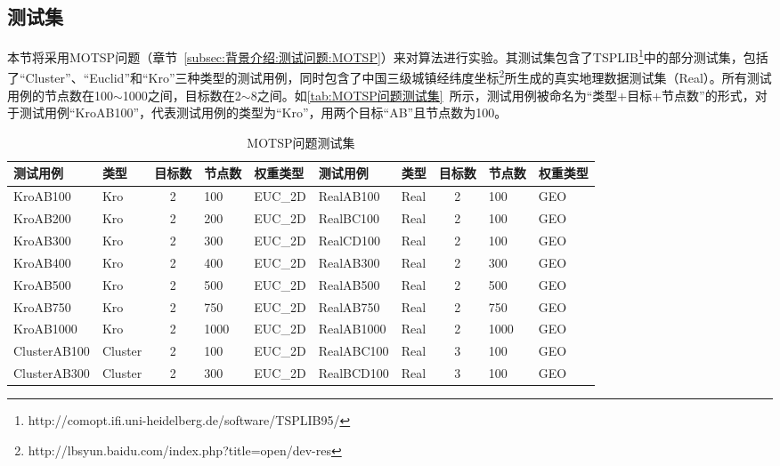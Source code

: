 \subsection{测试集}
\label{subsec:NST:实验与讨论:测试集}
本节将采用MOTSP问题（章节~\ref{subsec:背景介绍:测试问题:MOTSP}）来对算法进行实验。其测试集包含了TSPLIB\footnote{http://comopt.ifi.uni-heidelberg.de/software/TSPLIB95/}中的部分测试集，包括了“Cluster”、“Euclid”和“Kro”三种类型的测试用例，同时包含了中国三级城镇经纬度坐标\footnote{http://lbsyun.baidu.com/index.php?title=open/dev-res}所生成的真实地理数据测试集（Real）。所有测试用例的节点数在100$\sim$1000之间，目标数在2$\sim$8之间。如\autoref{tab:MOTSP问题测试集}~所示，测试用例被命名为“类型+目标+节点数”的形式，对于测试用例“KroAB100”，代表测试用例的类型为“Kro”，用两个目标“AB”且节点数为100。
\par
\begin{table}[h]
    \small
    \renewcommand\tabcolsep{4.5pt}
    \centering
    \caption{MOTSP问题测试集 \label{tab:MOTSP问题测试集}}
    \begin{threeparttable}
        \begin{tabular}{llcll|llcll}
        \toprule
        测试用例  & 类型 & 目标数   & 节点数   & 权重类型  & 测试用例  & 类型 & 目标数   & 节点数   & 权重类型 \\
        \midrule
        KroAB100 & Kro   & 2     & 100   & EUC\_2D & RealAB100 & Real  & 2     & 100   & GEO \\
        KroAB200 & Kro   & 2     & 200   & EUC\_2D & RealBC100 & Real  & 2     & 100   & GEO \\
        KroAB300 & Kro   & 2     & 300   & EUC\_2D & RealCD100 & Real  & 2     & 100   & GEO \\
        KroAB400 & Kro   & 2     & 400   & EUC\_2D & RealAB300 & Real  & 2     & 300   & GEO \\
        KroAB500 & Kro   & 2     & 500   & EUC\_2D & RealAB500 & Real  & 2     & 500   & GEO \\
        KroAB750 & Kro   & 2     & 750   & EUC\_2D & RealAB750 & Real  & 2     & 750   & GEO \\
        KroAB1000 & Kro   & 2     & 1000  & EUC\_2D & RealAB1000 & Real  & 2     & 1000  & GEO \\
        ClusterAB100 & Cluster & 2     & 100   & EUC\_2D & RealABC100 & Real  & 3     & 100   & GEO \\
        ClusterAB300 & Cluster & 2     & 300   & EUC\_2D & RealBCD100 & Real  & 3     & 100   & GEO \\

\end{tabular}
\end{threeparttable}
\end{table}
